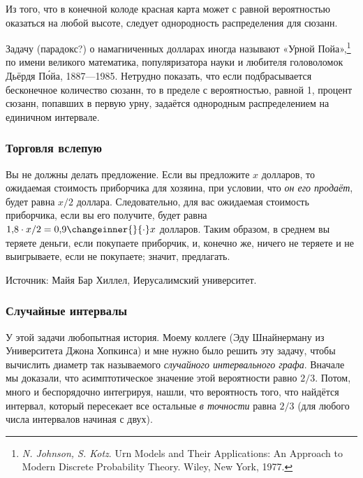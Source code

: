 \documentclass[twoside]{book}
\begin{document}
Из того, что в конечной колоде красная карта может с равной вероятностью оказаться на любой высоте, следует однородность распределения для сюзанн.\heart
 
Задачу (парадокс?) о намагниченных долларах иногда называют «Урной Пойа»,\footnote{\emph{N. Johnson, S. Kotz}. {Urn Models and Their Applications: An Approach to Modern Discrete Probability Theory.} Wiley, New York, 1977.} по имени великого математика, популяризатора науки и любителя головоломок Дьёрдя П\'{о}йа, 1887---1985.
Нетрудно показать, что если подбрасывается бесконечное количество сюзанн, то в пределе с вероятностью, равной 1, процент сюзанн, попавших в первую урну, задаётся однородным распределением на единичном интервале.

\subsubsection*{Торговля вслепую}%

Вы не должны делать предложение.
Если вы предложите $x$ долларов, то ожидаемая стоимость приборчика для хозяина, при условии, что \emph{он его продаёт}, будет равна $x/2$ доллара.
Следовательно, для вас ожидаемая стоимость приборчика, если вы его получите, будет равна $1{,}8 \cdot  x/2=0{,}9\changeinner{}{\cdot} x$ долларов.
Таким образом, в среднем вы теряете деньги, если покупаете приборчик, и, конечно же, ничего не теряете и не выигрываете, если не покупаете;
значит,  предлагать.
\heart

\medskip
{\small 
  Источник: Майя Бар Хиллел, Иерусалимский университет.

  }

\subsubsection*{Случайные интервалы}%

У этой задачи любопытная история.
Моему коллеге (Эду Шнайнерману из Университета Джона Хопкинса) и мне нужно было решить эту задачу, чтобы вычислить диаметр так называемого \emph{случайного интервального графа}. 
Вначале мы доказали, что асимптотическое значение этой вероятности равно $2/3$.
Потом, много и беспорядочно интегрируя, нашли, что вероятность того, что найдётся интервал, который пересекает все остальные \emph{в точности} равна $2/3$ (для любого числа интервалов начиная с двух).
\end{document}
